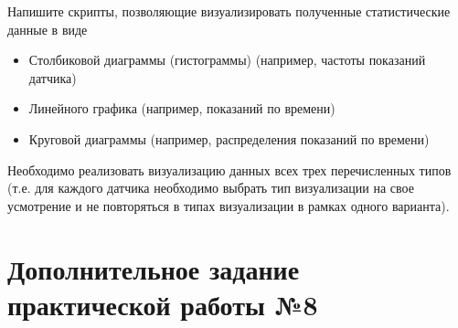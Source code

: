 \documentclass[a4paper,14pt]{extarticle}
\begin{document}
\begin{problem}
	Напишите скрипты, позволяющие визуализировать полученные статистические
	данные в виде
	\begin{itemize}
		\item Столбиковой диаграммы (гистограммы) (например, частоты показаний
		датчика)
		\item Линейного графика (например, показаний по времени)
		\item Круговой диаграммы (например, распределения показаний по времени)
	\end{itemize}
Необходимо реализовать визуализацию данных всех трех перечисленных типов (т.е.
для каждого датчика необходимо выбрать тип визуализации на свое усмотрение и
не повторяться в типах визуализации в рамках одного варианта). 
\end{problem}

\newpage
\section{Дополнительное задание\\практической работы №8}
\end{document}
